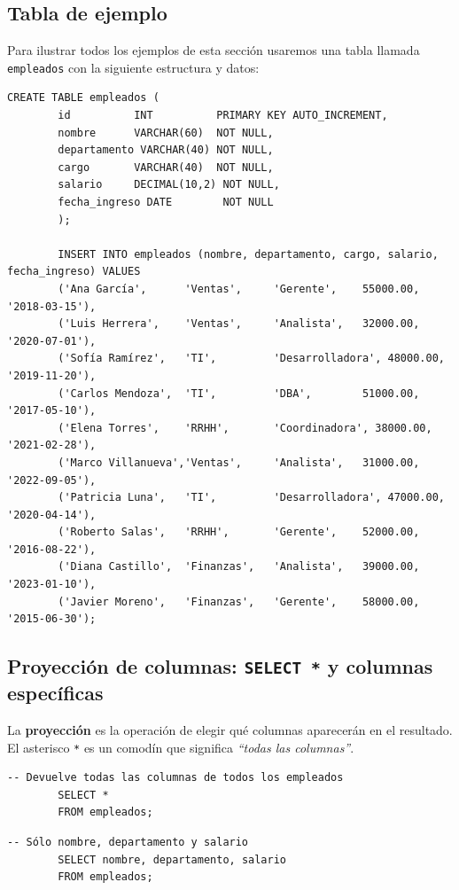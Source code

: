 \documentclass[12pt, a4paper]{article}
\begin{document}
	\subsection{Tabla de ejemplo}
	
	Para ilustrar todos los ejemplos de esta sección usaremos una tabla
	llamada \texttt{empleados} con la siguiente estructura y datos:
	
	\begin{lstlisting}[caption={Creación e inicialización de la tabla \texttt{empleados}.}]
		CREATE TABLE empleados (
		id          INT          PRIMARY KEY AUTO_INCREMENT,
		nombre      VARCHAR(60)  NOT NULL,
		departamento VARCHAR(40) NOT NULL,
		cargo       VARCHAR(40)  NOT NULL,
		salario     DECIMAL(10,2) NOT NULL,
		fecha_ingreso DATE        NOT NULL
		);
		
		INSERT INTO empleados (nombre, departamento, cargo, salario, fecha_ingreso) VALUES
		('Ana García',      'Ventas',     'Gerente',    55000.00, '2018-03-15'),
		('Luis Herrera',    'Ventas',     'Analista',   32000.00, '2020-07-01'),
		('Sofía Ramírez',   'TI',         'Desarrolladora', 48000.00, '2019-11-20'),
		('Carlos Mendoza',  'TI',         'DBA',        51000.00, '2017-05-10'),
		('Elena Torres',    'RRHH',       'Coordinadora', 38000.00, '2021-02-28'),
		('Marco Villanueva','Ventas',     'Analista',   31000.00, '2022-09-05'),
		('Patricia Luna',   'TI',         'Desarrolladora', 47000.00, '2020-04-14'),
		('Roberto Salas',   'RRHH',       'Gerente',    52000.00, '2016-08-22'),
		('Diana Castillo',  'Finanzas',   'Analista',   39000.00, '2023-01-10'),
		('Javier Moreno',   'Finanzas',   'Gerente',    58000.00, '2015-06-30');
	\end{lstlisting}
	
	\subsection{Proyección de columnas: \texttt{SELECT *} y columnas específicas}
	
	La \textbf{proyección} es la operación de elegir qué columnas
	aparecerán en el resultado.
	El asterisco \texttt{*} es un comodín que significa
	\textit{``todas las columnas''}.
	
	\begin{lstlisting}[caption={Seleccionar todas las columnas.}]
		-- Devuelve todas las columnas de todos los empleados
		SELECT *
		FROM empleados;
	\end{lstlisting}
	
	\begin{lstlisting}[caption={Seleccionar columnas específicas.}]
		-- Sólo nombre, departamento y salario
		SELECT nombre, departamento, salario
		FROM empleados;
	\end{lstlisting}
	
\end{document}
